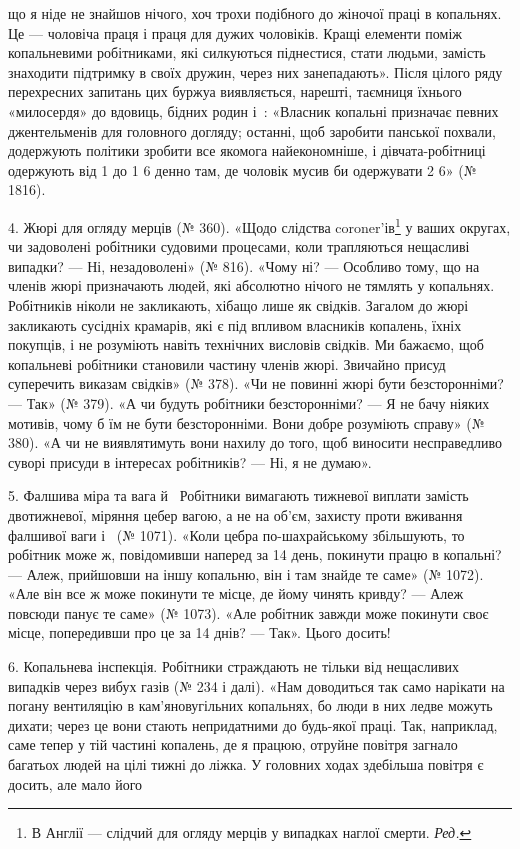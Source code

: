 \parcont{}  %
що я ніде не знайшов нічого, хоч трохи подібного до жіночої
праці в копальнях. Це — чоловіча праця і праця для дужих
чоловіків. Кращі елементи поміж копальневими робітниками,
які силкуються піднестися, стати людьми, замість знаходити підтримку
в своїх дружин, через них занепадають». Після цілого
ряду перехресних запитань цих буржуа виявляється, нарешті,
таємниця їхнього «милосердя» до вдовиць, бідних родин і~:
«Власник копальні призначає певних джентельменів для головного
догляду; останні, щоб заробити панської похвали, додержують
політики зробити все якомога найекономніше, і дівчата-робітниці
одержують від 1 до 1 6 денно там,
де чоловік мусив би одержувати 2 6» (№ 1816).

4. Жюрі для огляду мерців (№ 360). «Щодо слідства coroner’ів\footnote*{
В Англії — слідчий для огляду мерців у випадках наглої смерти. \emph{Ред.}
}
у ваших округах, чи задоволені робітники судовими процесами,
коли трапляються нещасливі випадки? — Ні, незадоволені»
(№ 816). «Чому ні? — Особливо тому, що на членів жюрі призначають
людей, які абсолютно нічого не тямлять у копальнях. Робітників
ніколи не закликають, хібащо лише як свідків. Загалом
до жюрі закликають сусідніх крамарів, які є під впливом власників
копалень, їхніх покупців, і не розуміють навіть технічних
висловів свідків. Ми бажаємо, щоб копальневі робітники становили
частину членів жюрі. Звичайно присуд суперечить виказам
свідків» (№ 378). «Чи не повинні жюрі бути безсторонніми? —
Так» (№ 379). «А чи будуть робітники безсторонніми? — Я не
бачу ніяких мотивів, чому б їм не бути безсторонніми. Вони
добре розуміють справу» (№ 380). «А чи не виявлятимуть вони
нахилу до того, щоб виносити несправедливо суворі присуди в
інтересах робітників? — Ні, я не думаю».

5. Фалшива міра та вага й~ Робітники вимагають тижневої
виплати замість двотижневої, міряння цебер вагою, а не
на об’єм, захисту проти вживання фалшивої ваги і~
(№ 1071). «Коли цебра по-шахрайському збільшують, то робітник
може ж, повідомивши наперед за 14 день, покинути працю
в копальні? — Алеж, прийшовши на іншу копальню, він і там
знайде те саме» (№ 1072). «Але він все ж може покинути те місце,
де йому чинять кривду? — Алеж повсюди панує те саме» (№ 1073).
«Але робітник завжди може покинути своє місце, попередивши
про це за 14 днів? — Так». Цього досить!

6. Копальнева інспекція. Робітники страждають не тільки
від нещасливих випадків через вибух газів (№ 234 і далі). «Нам
доводиться так само нарікати на погану вентиляцію в кам’яновугільних
копальнях, бо люди в них ледве можуть дихати;
через це вони стають непридатними до будь-якої праці. Так,
наприклад, саме тепер у тій частині копалень, де я працюю,
отруйне повітря загнало багатьох людей на цілі тижні до ліжка.
У головних ходах здебільша повітря є досить, але мало його
\parbreak{}  %
